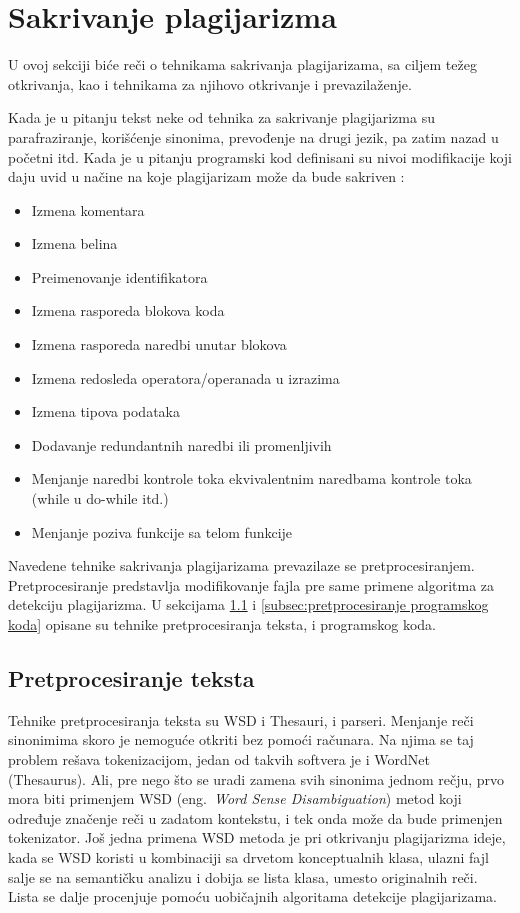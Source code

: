 \documentclass[a4paper]{article}
\begin{document}
\section{Sakrivanje plagijarizma}
\label{sec:sakrivanje plagijarizma}

U ovoj sekciji biće reči o tehnikama sakrivanja plagijarizama, sa ciljem težeg otkrivanja, kao i tehnikama za njihovo otkrivanje i prevazilaženje.
\par Kada je u pitanju tekst neke od tehnika za sakrivanje plagijarizma su parafraziranje, korišćenje sinonima, prevođenje na drugi jezik, pa zatim nazad u početni itd. Kada je u pitanju programski kod definisani su nivoi modifikacije koji daju uvid u načine na koje plagijarizam može da bude sakriven \cite{joyluck}:

\begin{itemize}
\item Izmena komentara
\item Izmena belina
\item Preimenovanje identifikatora
\item Izmena rasporeda blokova koda
\item Izmena rasporeda naredbi unutar blokova
\item Izmena redosleda operatora/operanada u izrazima
\item Izmena tipova podataka
\item Dodavanje redundantnih naredbi ili promenljivih
\item Menjanje naredbi kontrole toka ekvivalentnim naredbama kontrole toka (while u do-while itd.)
\item Menjanje poziva funkcije sa telom funkcije
\end{itemize}

Navedene tehnike sakrivanja plagijarizama prevazilaze se pretprocesiranjem. Pretprocesiranje predstavlja modifikovanje fajla pre same primene algoritma za detekciju plagijarizma. U sekcijama \ref{subsec:pretprocesiranje teksta} i \ref{subsec:pretprocesiranje programskog koda} opisane su tehnike pretprocesiranja teksta, i programskog koda.

\subsection{Pretprocesiranje teksta}
\label{subsec:pretprocesiranje teksta}

Tehnike pretprocesiranja teksta su WSD i Thesauri, i parseri. Menjanje reči sinonimima skoro je nemoguće otkriti bez pomoći računara. Na njima se taj problem rešava tokenizacijom, jedan od takvih softvera je i WordNet \cite{fellbaum} (Thesaurus). Ali, pre nego što se uradi zamena svih sinonima jednom rečju, prvo mora biti primenjem WSD (eng.~{\em Word Sense Disambiguation}) metod koji određuje značenje reči u zadatom kontekstu, i tek onda može da bude primenjen tokenizator. Još jedna primena WSD metoda je pri otkrivanju plagijarizma ideje, kada se WSD koristi u kombinaciji sa drvetom konceptualnih klasa, ulazni fajl salje se na semantičku analizu i dobija se lista klasa, umesto originalnih reči. Lista se dalje procenjuje pomoću uobičajnih algoritama detekcije plagijarizama.
\end{document}
